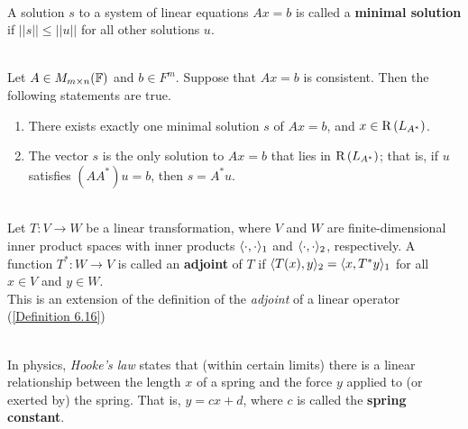 \begin{definition}
	\hfill\\
	A solution $s$ to a system of linear equations $Ax = b$ is called a \textbf{minimal solution} if $||s|| \leq ||u||$ for all other solutions $u$.
\end{definition}

\begin{theorem}
	\hfill\\
	Let $A \in M_{m \times n}(\mathbb{F})$ and $b \in F^m$. Suppose that $Ax = b$ is consistent. Then the following statements are true.

	\begin{enumerate}
		\item There exists exactly one minimal solution $s$ of $Ax = b$, and $x \in \text{R}\left(L_{A^*}\right)$.
		\item The vector $s$ is the only solution to $Ax = b$ that lies in $\text{R}\left(L_{A^*}\right)$; that is, if $u$ satisfies $(AA^*)u = b$, then $s = A^*u$.
	\end{enumerate}
\end{theorem}

\begin{definition}
	\hfill\\
	Let $T: V \to W$ be a linear transformation, where $V$ and $W$ are finite-dimensional inner product spaces with inner products $\langle\cdot, \cdot\rangle_1$ and $\langle\cdot, \cdot\rangle_2$, respectively. A function $T^*: W \to V$ is called an \textbf{adjoint} of $T$ if $\langle T(x),y\rangle_2 = \langle x,T^*{y}\rangle_1$ for all $x \in V$ and $y \in W$.\\

	This is an extension of the definition of the \textit{adjoint} of a linear operator (\autoref{Definition 6.16})
\end{definition}

\begin{definition}
	\hfill\\
	In physics, \textit{Hooke's law} states that (within certain limits) there is a linear relationship between the length $x$ of a spring and the force $y$ applied to (or exerted by) the spring. That is, $y = cx + d$, where $c$ is called the \textbf{spring constant}.
\end{definition}
